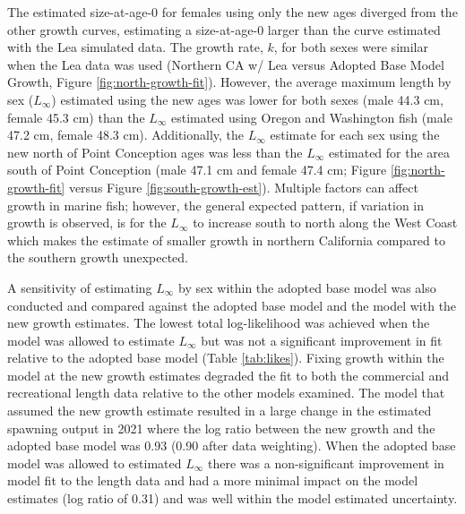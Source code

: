 \documentclass[11pt,
  english,
  a4paper,
]{article}
\begin{document}
The estimated size-at-age-0 for females using only the new ages diverged from the other growth curves, estimating a size-at-age-0 larger than the curve estimated with the Lea simulated data. The growth rate, {\(k\)\leavevmode\tagmcend\tagstructend}, for both sexes were similar when the Lea data was used (Northern CA w/ Lea versus Adopted Base Model Growth, Figure \ref{fig:north-growth-fit}). However, the average maximum length by sex ({\(L_{\infty}\)\leavevmode\tagmcend\tagstructend}) estimated using the new ages was lower for both sexes (male 44.3 cm, female 45.3 cm) than the {\(L_{\infty}\)\leavevmode\tagmcend\tagstructend} estimated using Oregon and Washington fish (male 47.2 cm, female 48.3 cm). Additionally, the {\(L_{\infty}\)\leavevmode\tagmcend\tagstructend} estimate for each sex using the new north of Point Conception ages was less than the {\(L_{\infty}\)\leavevmode\tagmcend\tagstructend} estimated for the area south of Point Conception (male 47.1 cm and female 47.4 cm; Figure \ref{fig:north-growth-fit} versus Figure \ref{fig:south-growth-est}). Multiple factors can affect growth in marine fish; however, the general expected pattern, if variation in growth is observed, is for the {\(L_{\infty}\)\leavevmode\tagmcend\tagstructend} to increase south to north along the West Coast which makes the estimate of smaller growth in northern California compared to the southern growth unexpected.

\leavevmode\tagmcend\tagstructend\par


A sensitivity of estimating {\(L_{\infty}\)\leavevmode\tagmcend\tagstructend} by sex within the adopted base model was also conducted and compared against the adopted base model and the model with the new growth estimates. The lowest total log-likelihood was achieved when the model was allowed to estimate {\(L_{\infty}\)\leavevmode\tagmcend\tagstructend} but was not a significant improvement in fit relative to the adopted base model (Table \ref{tab:likes}). Fixing growth within the model at the new growth estimates degraded the fit to both the commercial and recreational length data relative to the other models examined. The model that assumed the new growth estimate resulted in a large change in the estimated spawning output in 2021 where the log ratio between the new growth and the adopted base model was 0.93 (0.90 after data weighting). When the adopted base model was allowed to estimated {\(L_{\infty}\)\leavevmode\tagmcend\tagstructend} there was a non-significant improvement in model fit to the length data and had a more minimal impact on the model estimates (log ratio of 0.31) and was well within the model estimated uncertainty.
\end{document}
